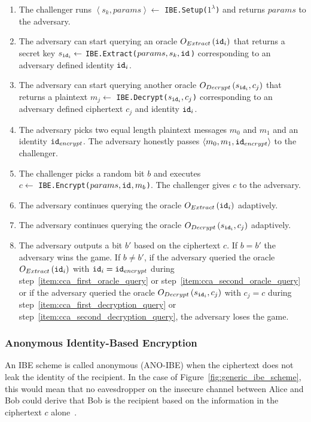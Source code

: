 \begin{algorithm}
 \begin{enumerate}
  \item The challenger runs $\left< s_k, params\right> \leftarrow$ \texttt{IBE.Setup($1^{\lambda}$)} and returns $params$ to the adversary.
  \item \label{item:cca_first_oracle_query} The adversary can start querying an oracle $O_{Extract} \left( \mathtt{id}_{i} \right)$ that returns a secret key $s_{\mathtt{id}_{i}} \leftarrow$ \texttt{IBE.Extract($params, s_k, \mathtt{id}_{}$)} corresponding to an adversary defined identity $\mathtt{id}_{i}$.
  \item \label{item:cca_first_decryption_query} The adversary can start querying another oracle $O_{Decrypt} \left( s_{\mathtt{id}_{i}}, c_j \right)$ that returns a plaintext $m_j \leftarrow$ \texttt{IBE.Decrypt($s_{\mathtt{id}_{i}}, c_j$)} corresponding to an adversary defined ciphertext $c_j$ and identity $\mathtt{id}_{i}$.
  \item The adversary picks two equal length plaintext messages $m_0$ and $m_1$ and an identity $\mathtt{id}_{encrypt}$. The adversary honestly passes $\left< m_0, m_1, \mathtt{id}_{encrypt} \right>$ to the challenger.
  \item The challenger picks a random bit $b$ and executes \\ $c \leftarrow$ \texttt{IBE.Encrypt($params, \mathtt{id}_{}, m_b$)}. The challenger gives $c$ to the adversary.
  \item \label{item:cca_second_oracle_query} The adversary continues querying the oracle $O_{Extract} \left( \mathtt{id}_{i} \right)$ adaptively.
  \item \label{item:cca_second_decryption_query} The adversary continues querying the oracle $O_{Decrypt} \left( s_{\mathtt{id}_{i}}, c_j \right)$ adaptively.
  \item The adversary outputs a bit $b'$ based on the ciphertext $c$. If $b = b'$ the adversary wins the game. If $b \neq b'$, if the adversary queried the oracle $O_{Extract} \left( \mathtt{id}_{i} \right)$ with $\mathtt{id}_{i} = \mathtt{id}_{encrypt}$ during step~\ref{item:cca_first_oracle_query} or step~\ref{item:cca_second_oracle_query} or if the adversary queried the oracle $O_{Decrypt} \left( s_{\mathtt{id}_{i}}, c_j \right)$ with $c_j = c$ during step~\ref{item:cca_first_decryption_query} or step~\ref{item:cca_second_decryption_query}, the adversary loses the game.
 \end{enumerate}
\end{algorithm}

\subsubsection{Anonymous Identity-Based Encryption}
An IBE scheme is called anonymous (ANO-IBE) when the ciphertext does not leak the identity of the recipient. In the case of Figure~\ref{fig:generic_ibe_scheme}, this would mean that no eavesdropper on the insecure channel between Alice and Bob could derive that Bob is the recipient based on the information in the ciphertext $c$ alone~\cite{art:BoyenW06}.

